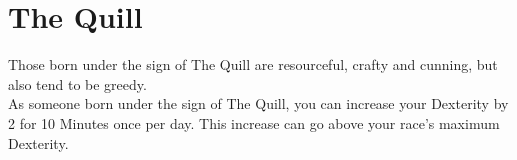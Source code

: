 \section{The Quill}

Those born under the sign of The Quill are resourceful, crafty and cunning, but also tend to be greedy.\\
As someone born under the sign of The Quill, you can increase your Dexterity by 2 for 10 Minutes once per day. This increase can go above your race's maximum Dexterity.\\